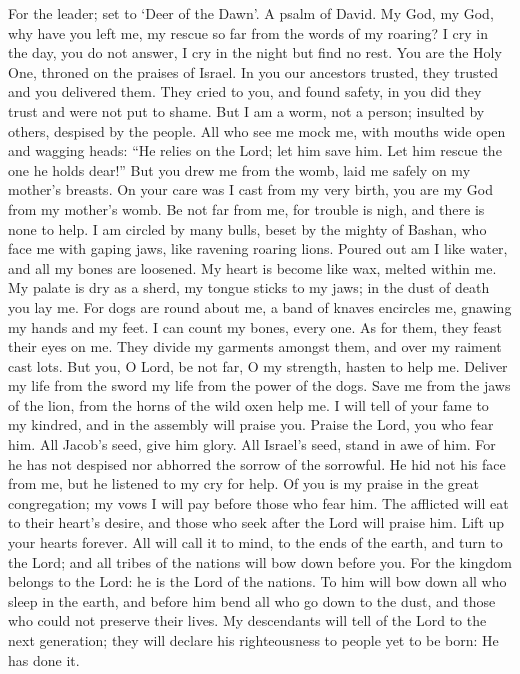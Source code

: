 For the leader; set to `Deer of the Dawn'. A psalm of David.
 My God, my God, why have you left me, my rescue so far from
the words of my roaring?  I cry in the day, you do not
answer, I cry in the night but find no rest.  You are the
Holy One, throned on the praises of Israel.  In you our
ancestors trusted, they trusted and you delivered them. 
They cried to you, and found safety, in you did they trust and were not
put to shame.  But I am a worm, not a person; insulted by
others, despised by the people.  All who see me mock me,
with mouths wide open and wagging heads:  ``He relies on the
Lord; let him save him. Let him rescue the one he holds dear!''
 But you drew me from the womb, laid me safely on my
mother's breasts.  On your care was I cast from my very
birth, you are my God from my mother's womb.  Be not far
from me, for trouble is nigh, and there is none to help.  I
am circled by many bulls, beset by the mighty of Bashan, 
who face me with gaping jaws, like ravening roaring lions. 
Poured out am I like water, and all my bones are loosened. My heart is
become like wax, melted within me.  My palate is dry as a
sherd, my tongue sticks to my jaws; in the dust of death you lay me.
 For dogs are round about me, a band of knaves encircles
me, gnawing my hands and my feet.  I can count my bones,
every one. As for them, they feast their eyes on me.  They
divide my garments amongst them, and over my raiment cast lots.
 But you, O Lord, be not far, O my strength, hasten to help
me.  Deliver my life from the sword my life from the power
of the dogs.  Save me from the jaws of the lion, from the
horns of the wild oxen help me.  I will tell of your fame
to my kindred, and in the assembly will praise you.  Praise
the Lord, you who fear him. All Jacob's seed, give him glory. All
Israel's seed, stand in awe of him.  For he has not
despised nor abhorred the sorrow of the sorrowful. He hid not his face
from me, but he listened to my cry for help.  Of you is my
praise in the great congregation; my vows I will pay before those who
fear him.  The afflicted will eat to their heart's desire,
and those who seek after the Lord will praise him. Lift up your hearts
forever.  All will call it to mind, to the ends of the
earth, and turn to the Lord; and all tribes of the nations will bow down
before you.  For the kingdom belongs to the Lord: he is the
Lord of the nations.  To him will bow down all who sleep in
the earth, and before him bend all who go down to the dust, and those
who could not preserve their lives.  My descendants will
tell of the Lord to the next generation;  they will declare
his righteousness to people yet to be born: He has done it.

